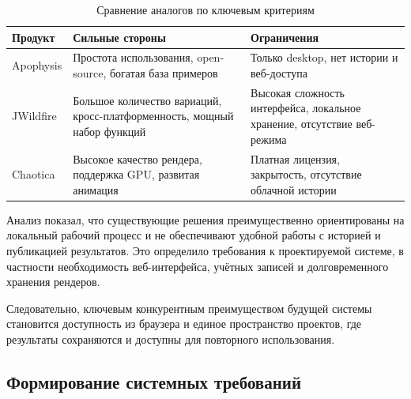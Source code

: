 \begin{table}[H]
  \centering
  \caption{Сравнение аналогов по ключевым критериям}
  \label{tab:analogs}
  \begin{tabularx}{\textwidth}{|p{3.6cm}|X|X|}
    \hline
    Продукт   & Сильные стороны                                                          & Ограничения                                                             \\
    \hline
    Apophysis & Простота использования, open-source, богатая база примеров               & Только desktop, нет истории и веб-доступа                               \\
    \hline
    JWildfire & Большое количество вариаций, кросс-платформенность, мощный набор функций & Высокая сложность интерфейса, локальное хранение, отсутствие веб-режима \\
    \hline
    Chaotica  & Высокое качество рендера, поддержка GPU, развитая анимация               & Платная лицензия, закрытость, отсутствие облачной истории               \\
    \hline
  \end{tabularx}
\end{table}

Анализ показал, что существующие решения преимущественно ориентированы на локальный рабочий процесс и не обеспечивают удобной работы с историей и публикацией результатов. Это определило требования к проектируемой системе, в частности необходимость веб-интерфейса, учётных записей и долговременного хранения рендеров.

Следовательно, ключевым конкурентным преимуществом будущей системы становится доступность из браузера и единое пространство проектов, где результаты сохраняются и доступны для повторного использования.

\subsection{Формирование системных требований}

